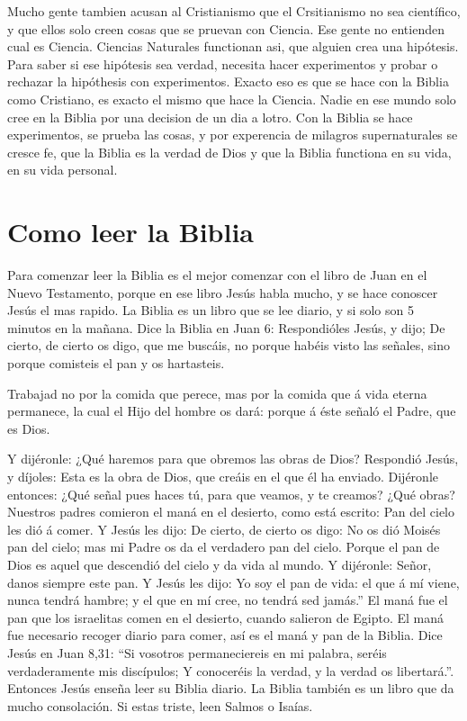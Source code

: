 Mucho gente tambien acusan al Cristianismo que el Crsitianismo no sea
científico, y que ellos solo creen cosas que se pruevan con Ciencia. Ese
gente no entienden cual es Ciencia. Ciencias Naturales functionan asi,
que alguien crea una hipótesis. Para saber si ese hipótesis sea verdad,
necesita hacer experimentos y probar o rechazar la hipóthesis con
experimentos. Exacto eso es que se hace con la Biblia como Cristiano, es
exacto el mismo que hace la Ciencia. Nadie en ese mundo solo cree en la
Biblia por una decision de un dia a l\textquotesingle otro. Con la
Biblia se hace experimentos, se prueba las cosas, y por experencia de
milagros supernaturales se cresce fe, que la Biblia es la verdad de Dios
y que la Biblia functiona en su vida, en su vida personal.

\hypertarget{como-leer-la-biblia}{%
\section{Como leer la Biblia}\label{como-leer-la-biblia}}

Para comenzar leer la Biblia es el mejor comenzar con el libro de Juan
en el Nuevo Testamento, porque en ese libro Jesús habla mucho, y se hace
conoscer Jesús el mas rapido. La Biblia es un libro que se lee diario, y
si solo son 5 minutos en la mañana. Dice la Biblia en Juan 6:
 Respondióles Jesús, y dijo; De cierto, de cierto os
digo, que me buscáis, no porque habéis visto las señales, sino porque
comisteis el pan y os hartasteis.

 Trabajad no por la comida que perece, mas por la comida
que á vida eterna permanece, la cual el Hijo del hombre os dará: porque
á éste señaló el Padre, que es Dios.

 Y dijéronle: ¿Qué haremos para que obremos las obras de
Dios?  Respondió Jesús, y díjoles: Esta es la obra de
Dios, que creáis en el que él ha enviado.  Dijéronle
entonces: ¿Qué señal pues haces tú, para que veamos, y te creamos? ¿Qué
obras?  Nuestros padres comieron el maná en el desierto,
como está escrito: Pan del cielo les dió á comer.  Y
Jesús les dijo: De cierto, de cierto os digo: No os dió Moisés pan del
cielo; mas mi Padre os da el verdadero pan del cielo. 
Porque el pan de Dios es aquel que descendió del cielo y da vida al
mundo.  Y dijéronle: Señor, danos siempre este pan.
 Y Jesús les dijo: Yo soy el pan de vida: el que á mí
viene, nunca tendrá hambre; y el que en mí cree, no tendrá sed jamás.''
El maná fue el pan que los israelitas comen en el desierto, cuando
salieron de Egipto. El maná fue necesario recoger diario para comer, así
es el maná y pan de la Biblia. Dice Jesús en Juan 8,31: ``Si vosotros
permaneciereis en mi palabra, seréis verdaderamente mis discípulos; Y
conoceréis la verdad, y la verdad os libertará.''. Entonces Jesús enseña
leer su Biblia diario. La Biblia también es un libro que da mucho
consolación. Si estas triste, leen Salmos o Isaías.

